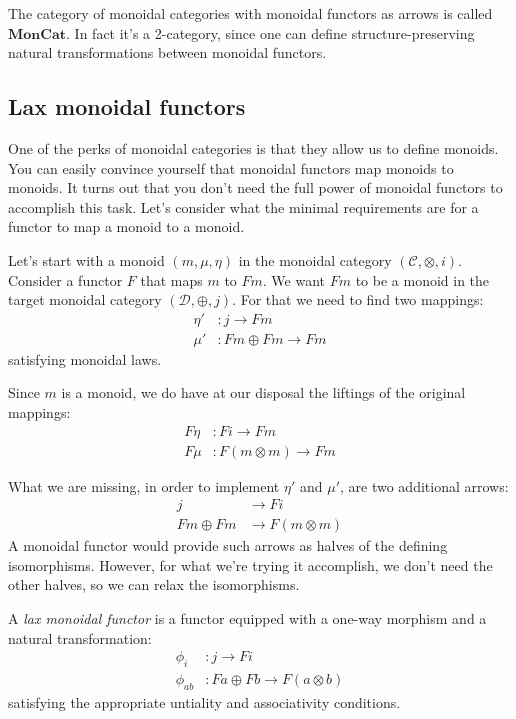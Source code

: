 \documentclass[DaoFP]{subfiles}
\begin{document}
The category of monoidal categories with monoidal functors as arrows is called $\mathbf{MonCat}$. In fact it's a 2-category, since one can define structure-preserving natural transformations between monoidal functors.

\subsection{Lax monoidal functors}

One of the perks of monoidal categories is that they allow us to define monoids. You can easily convince yourself that monoidal functors map monoids to monoids. It turns out that you don't need the full power of monoidal functors to accomplish this task. Let's consider what the minimal requirements are  for a functor to map a monoid to a monoid. 

Let's start with a monoid $(m, \mu, \eta)$ in the monoidal category $(\mathcal{C}, \otimes, i)$. Consider a functor $F$ that maps $m$ to $F m$. We want $F m$ to be a monoid in the target monoidal category $(\mathcal{D}, \oplus, j)$. For that we need to find two mappings:
\begin{align*}
\eta' &\colon j \to F m \\
 \mu' &\colon F m \oplus F m \to F m 
\end{align*}
satisfying monoidal laws.

Since $m$ is a monoid, we do have at our disposal the liftings of the original mappings:
\begin{align*}
 F \eta &\colon F i \to F m \\
 F \mu &\colon F (m \otimes m) \to F m
\end{align*}

What we are missing, in order to implement $\eta'$ and $\mu'$, are two additional arrows:
\begin{align*}
j &\to F i\\
 F m \oplus F m &\to F (m \otimes m)
 \end{align*}
A monoidal functor would provide such arrows as halves of the defining isomorphisms. However, for what we're trying it accomplish, we don't need the other halves, so we can relax the isomorphisms. 

A \emph{lax monoidal functor} is a functor equipped with a one-way morphism and a natural transformation:
\begin{align*}
\phi_i &\colon j \to F i \\
\phi_{a b} &\colon F a \oplus F b \to F (a \otimes b)
\end{align*}
satisfying the appropriate untiality and associativity conditions.
\end{document}
